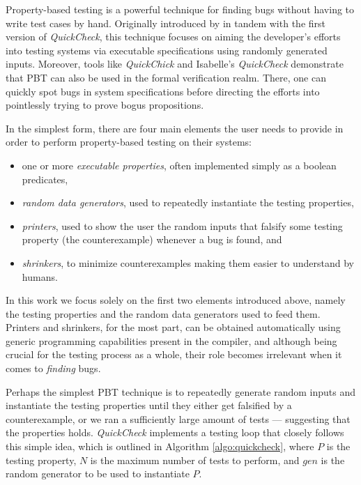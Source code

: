 \documentclass[acmsmall, anonymous]{acmart}
\newcommand{\quickcheck}{\textit{QuickCheck}\xspace}
\newcommand{\quickchick}{\textit{QuickChick}\xspace}
\begin{document}
Property-based testing is a powerful technique for finding bugs without having
to write test cases by hand.
%
Originally introduced by \citet{quickcheck} in tandem with the first version of
\quickcheck, this technique focuses on aiming the developer's efforts into
testing systems via executable specifications using randomly generated inputs.
%
Moreover, tools like \quickchick and Isabelle's \quickcheck demonstrate
that PBT can also be used in the formal verification realm.
%
There, one can quickly spot bugs in system specifications before directing the
efforts into pointlessly trying to prove bogus propositions.


In the simplest form, there are four main elements the user needs to provide in
order to perform property-based testing on their systems:
%
\begin{itemize}
\item one or more \emph{executable properties}, often implemented simply as a
  boolean predicates,
\item \emph{random data generators}, used to repeatedly instantiate the testing
  properties,
\item \emph{printers}, used to show the user the random inputs that falsify some
  testing property (the counterexample) whenever a bug is found, and
\item \emph{shrinkers}, to minimize counterexamples making them easier to
  understand by humans.
\end{itemize}

\noindent In this work we focus solely on the first two elements introduced
above, namely the testing properties and the random data generators used to feed
them.
%
Printers and shrinkers, for the most part, can be obtained automatically using
generic programming capabilities present in the compiler, and although being
crucial for the testing process as a whole, their role becomes irrelevant when
it comes to \emph{finding} bugs.

\begin{algorithm}[ b]
  \SetAlgoLined
  \DontPrintSemicolon
\caption{\label{algo:quickcheck}\quickcheck Testing Loop}
\end{algorithm}

Perhaps the simplest PBT technique is to repeatedly generate random inputs and
instantiate the testing properties until they either get falsified by a
counterexample, or we ran a sufficiently large amount of tests --- suggesting
that the properties holds.
%
\quickcheck implements a testing loop that closely follows this simple idea,
which is outlined in Algorithm \ref{algo:quickcheck}, where $P$ is the testing
property, $N$ is the maximum number of tests to perform, and $gen$ is the random
generator to be used to instantiate $P$.
\end{document}

